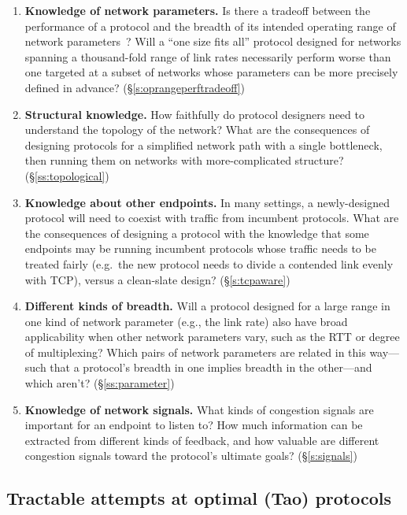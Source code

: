 \begin{enumerate}

\item \textbf{Knowledge of network parameters.} Is there a tradeoff
  between the performance of a protocol and the breadth of its
  intended operating range of network parameters~\cite{wroclawski}?
  Will a ``one size fits all'' protocol designed for networks spanning
  a thousand-fold range of link rates necessarily perform worse than
  one targeted at a subset of networks whose parameters can be more
  precisely defined in advance?  (\S\ref{s:oprangeperftradeoff})

\item \textbf{Structural knowledge.} How faithfully do protocol
  designers need to understand the topology of the network? What are
  the consequences of designing protocols for a simplified network
  path with a single bottleneck, then running them on networks with
  more-complicated structure?  (\S\ref{ss:topological})

\item \textbf{Knowledge about other endpoints.} In many settings, a
  newly-designed protocol will need to coexist with traffic from
  incumbent protocols. What are the consequences of designing a
  protocol with the knowledge that some endpoints may be running
  incumbent protocols whose traffic needs to be treated fairly
  (e.g.~the new protocol needs to divide a contended link evenly with
  TCP), versus a clean-slate design?  (\S\ref{s:tcpaware})

\item \textbf{Different kinds of breadth.} Will a protocol designed
  for a large range in one kind of network parameter (e.g., the link
  rate) also have broad applicability when other network parameters
  vary, such as the RTT or degree of multiplexing?  Which pairs of
  network parameters are related in this way---such that a protocol's
  breadth in one implies breadth in the other---and which aren't?
  (\S\ref{ss:parameter})

\item \textbf{Knowledge of network signals.} What kinds of congestion
  signals are important for an endpoint to listen to? How much
  information can be extracted from different kinds of feedback, and
  how valuable are different congestion signals toward the protocol's
  ultimate goals?  (\S\ref{s:signals})

\end{enumerate}

\subsection{Tractable attempts at optimal (Tao) protocols}

